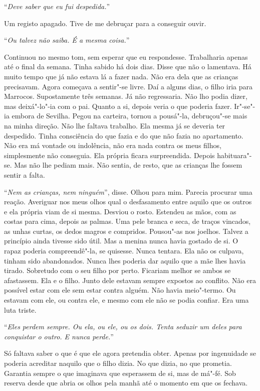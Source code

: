 ``\emph{Deve saber que eu fui despedida.}''

Um registo apagado. Tive de me debruçar para a conseguir ouvir.

``\emph{Ou talvez não saiba. É a mesma coisa.}''

Continuou no mesmo tom, sem esperar que eu respondesse. Trabalharia
apenas até o final da semana. Tinha sabido há dois dias. Disse que não
o lamentava. Há muito tempo que já não estava lá a fazer nada. Não era
dela que as crianças precisavam. Agora começava a sentir"-se livre. Daí
a alguns dias, o filho iria para Marrocos. Supostamente três semanas. Já
não regressaria. Não lho podia dizer, mas deixá"-lo"-ia com o pai.
Quanto a si, depois veria o que poderia fazer. Ir"-se"-ia embora de
Sevilha. Pegou na carteira, tornou a pousá"-la, debruçou"-se mais na
minha direção. Não lhe faltava trabalho. Ela mesma já se deveria ter
despedido. Tinha consciência do que fazia e do que não fazia no
apartamento. Não era má vontade ou indolência, não era nada contra os
meus filhos, simplesmente não conseguia. Ela própria ficara
surpreendida. Depois habituara"-se. Mas não lhe pediam mais. Não sentia,
de resto, que as crianças lhe fossem sentir a falta.

``\emph{Nem as crianças, nem ninguém}'',
disse. Olhou para mim. Parecia procurar uma reação. Averiguar nos meus
olhos qual o desfasamento entre aquilo que os outros e ela própria viam
de si mesma. Desviou o rosto. Estendeu as mãos, com as costas para cima,
depois as palmas. Uma pele branca e seca, de traços vincados, as unhas
curtas, os dedos magros e compridos. Pousou"-as nos joelhos. Talvez a
princípio ainda tivesse sido útil. Mas a menina nunca havia gostado de
si. O rapaz poderia compreendê"-la, se quisesse. Nunca tentara. Ela não
os culpava, tinham sido abandonados. Nunca lhes poderia dar aquilo que a
mãe lhes havia tirado. Sobretudo com o seu filho por perto. Ficariam
melhor se ambos se afastassem. Ela e o filho. Junto dele estavam sempre
expostos ao conflito. Não era possível estar com ele sem estar contra
alguém. Não havia meio"-termo. Ou estavam com ele, ou contra ele, e
mesmo com ele não se podia confiar. Era uma luta triste.

``\emph{Eles perdem sempre. Ou ela, ou ele, ou os dois. Tenta seduzir um
deles para conquistar o outro. E nunca perde.}''

Só faltava saber o que é que ele agora pretendia obter. Apenas por
ingenuidade se poderia acreditar naquilo que o filho dizia. No que
dizia, no que prometia. Garantia sempre o que imaginava que esperassem
de si, mas de má"-fé. Sob reserva desde que abria os olhos pela manhã
até o momento em que os fechava.

